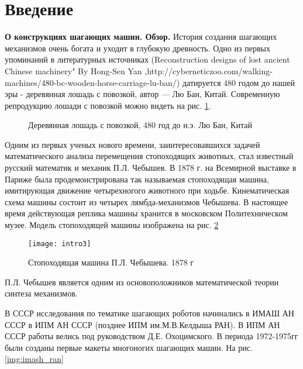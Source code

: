 \clearpage
\chapter*{Введение}
\textbf{О конструкциях шагающих машин. Обзор.} История создания шагающих механизмов очень богата и уходит в глубокую древность. Одно из первых упоминаний в литературных источниках (Reconstruction designs of lost ancient Chinese machinery" By Hong-Sen Yan ,http://cyberneticzoo.com/walking-machines/480-bc-wooden-horse-carriage-lu-ban/) датируется 480 годом до нашей эры - деревянная лошадь с повозкой, автор --- Лю Бан, Китай. Современную репродукцию лошади с повозкой можно видеть на рис. \ref{img:wooden_horse}.

\begin{figure}[h]
  \begin{minipage}[h]{0.49\linewidth}
  \end{minipage}
  \hfill
  \begin{minipage}[h]{0.49\linewidth}
  \end{minipage}
  \caption{Деревянная лошадь с повозкой, 480 год до н.э. Лю Бан, Китай}
  \label{img:wooden_horse}  
\end{figure}

Одним из первых ученых нового времени, заинтересовавшихся задачей математического анализа перемещения стопоходящих животных, стал известный русский математик и механик П.Л. Чебышев. В 1878 г. на Всемирной выставке в Париже была продемонстрирована так называемая стопоходящая машина, имитирующая движение четырехногого животного при ходьбе. Кинематическая схема машины состоит из четырех лямбда-механизмов Чебышева. В настоящее время действующая реплика машины хранится в московском Политехническом музее. Модель стопоходящей машины изображена на рис. \ref{img:chebishev}

\begin{figure}[h]
\centering
\texttt{[image: intro3]}
\caption{Стопоходящая машина П.Л. Чебышева. 1878 г}
\label{img:chebishev}
\end{figure}

П.Л. Чебышев является одним из основоположников математической теории синтеза механизмов.

В СССР исследования по тематике шагающих роботов начинались в ИМАШ АН СССР в ИПМ АН СССР (позднее ИПМ им.М.В.Келдыша РАН). В ИПМ АН СССР работы велись под руководством Д.Е. Охоцимского. В периода 1972-1975гг были созданы первые макеты многоногих шагающих машин. На рис. \ref{img:imash_ran}

